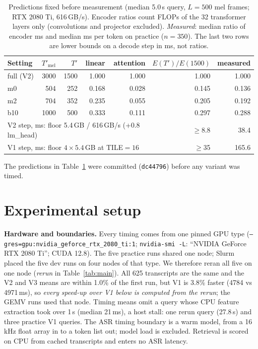 \documentclass{article}
\begin{document}
\begin{table}[t]
\centering
\small
\caption{Predictions fixed before measurement (median 5.0\,s query, $L=500$ mel
frames; RTX 2080 Ti, 616\,GB/s). Encoder ratios count FLOPs of the 32 transformer
layers only (convolutions and projector excluded). \emph{Measured}: median ratio of
encoder ms and median ms per token on practice ($n=350$). The last two rows are lower bounds on a decode step in ms, not ratios.}
\label{tab:costmodel}
\setlength{\tabcolsep}{3.5pt}
\begin{tabular}{lrrrrrr}
\toprule
Setting & $T'_{\mathrm{mel}}$ & $T'$ & linear & attention & $E(T')/E(1500)$ & measured \\
\midrule
full (V2) & 3000 & 1500 & 1.000 & 1.000 & 1.000 & 1.000 \\
m0  & 504  & 252 & 0.168 & 0.028 & 0.145 & 0.136 \\
m2  & 704  & 352 & 0.235 & 0.055 & 0.205 & 0.192 \\
b10 & 1000 & 500 & 0.333 & 0.111 & 0.297 & 0.288 \\
\midrule
\multicolumn{5}{l}{V2 step, ms: floor 5.4\,GB / 616\,GB/s (+0.8 lm\_head)} & $\ge$8.8 & 38.4 \\
\multicolumn{5}{l}{V1 step, ms: floor $4 \times 5.4$\,GB at TILE${}=16$} & $\ge$35 & 165.6 \\
\bottomrule
\end{tabular}
\end{table}

The predictions in Table~\ref{tab:costmodel} were committed (\texttt{dc44796}) before any
variant was timed.

\section{Experimental setup}
\label{sec:setup}

\textbf{Hardware and boundaries.} Every timing comes from one pinned GPU type
(\texttt{--gres=gpu:nvidia\_geforce\_rtx\_2080\_ti:1}; \texttt{nvidia-smi -L}:
``NVIDIA GeForce RTX 2080 Ti''; CUDA 12.8). The five practice runs shared one node;
Slurm placed the five dev runs on four nodes of that type. We therefore reran all five on one node (\emph{rerun} in Table~\ref{tab:main}). All 625
transcripts are the same and the V2 and V3 means are within 1.0\% of the first run, but
V1 is 3.8\% faster (4784 vs 4971\,ms), so \emph{every speed-up over V1 below is computed
from the rerun}; the GEMV runs used that node. Timing means omit a query whose CPU
feature extraction took over 1\,s (median 21\,ms), a host stall: one rerun query
(27.8\,s) and three practice V1 queries. The ASR timing boundary is a warm model, from a 16\,kHz float array in to a token
list out; model load is excluded. Retrieval is scored on CPU from cached transcripts and enters no ASR latency.
\end{document}
